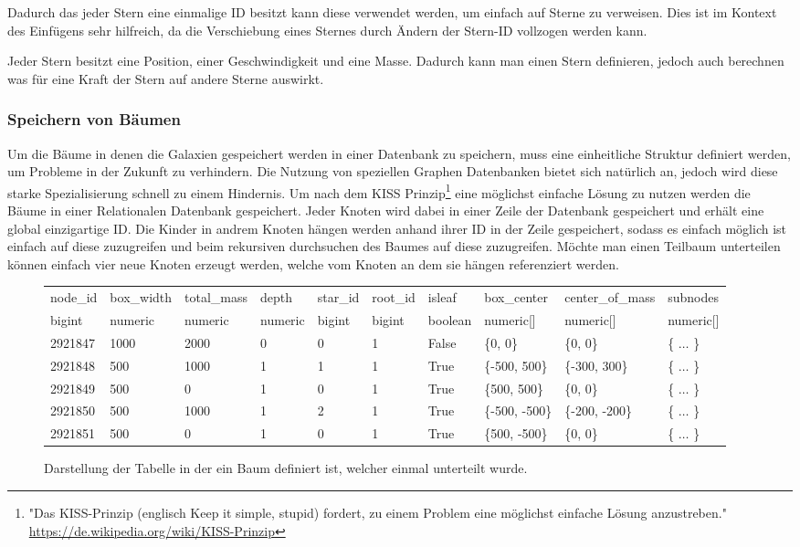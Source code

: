 Dadurch das jeder Stern eine einmalige ID besitzt kann diese verwendet werden, um einfach auf Sterne zu verweisen. Dies ist im Kontext des Einfügens sehr hilfreich, da die Verschiebung eines Sternes durch Ändern der Stern-ID vollzogen
werden kann.

\par Jeder Stern besitzt eine Position, einer Geschwindigkeit und eine Masse.
Dadurch kann man einen Stern definieren, jedoch auch berechnen was für eine
Kraft der Stern auf andere Sterne auswirkt.

\subsubsection{Speichern von Bäumen}
Um die Bäume in denen die Galaxien gespeichert werden in einer Datenbank zu
speichern, muss eine einheitliche Struktur definiert werden, um Probleme in der
Zukunft zu verhindern. Die Nutzung von speziellen Graphen Datenbanken bietet
sich natürlich an, jedoch wird diese starke Spezialisierung schnell zu einem
Hindernis. Um nach dem KISS Prinzip\footnote{"Das KISS-Prinzip (englisch Keep
it simple, stupid) fordert, zu einem Problem eine möglichst einfache Lösung
anzustreben." \url{https://de.wikipedia.org/wiki/KISS-Prinzip}} eine möglichst
einfache Lösung zu nutzen werden die Bäume in einer Relationalen Datenbank
gespeichert. Jeder Knoten wird dabei in einer Zeile der Datenbank gespeichert
und erhält eine global einzigartige ID. Die Kinder in andrem Knoten hängen
werden anhand ihrer ID in der Zeile gespeichert, sodass es einfach möglich ist
einfach auf diese zuzugreifen und beim rekursiven durchsuchen des Baumes auf
diese zuzugreifen. Möchte man einen Teilbaum unterteilen können einfach vier
neue Knoten erzeugt werden, welche vom Knoten an dem sie hängen referenziert
werden.

\begin{figure*}[ht]
\begin{tabular} {l | l | l | l | l | l | l | l | l | l}
node\_id & box\_width & total\_mass & depth & star\_id & root\_id & isleaf & box\_center & center\_of\_mass & subnodes  \\ 
bigint & numeric & numeric & numeric & bigint & bigint & boolean & numeric[] & numeric[] & numeric[]  \\ \hline\hline
2921847 & 1000 & 2000 & 0 & 0 & 1 & False & \{0, 0\}       & \{0, 0\}       & \{ \(\dots\) \}  \\ \hline
2921848 & 500  & 1000 & 1 & 1 & 1 & True  & \{-500, 500\}  & \{-300, 300\}  & \{ \(\dots\) \}  \\ \hline
2921849 & 500  & 0    & 1 & 0 & 1 & True  & \{500, 500\}   & \{0, 0\}       & \{ \(\dots\) \}  \\ \hline
2921850 & 500  & 1000 & 1 & 2 & 1 & True  & \{-500, -500\} & \{-200, -200\} & \{ \(\dots\) \}  \\ \hline
2921851 & 500  & 0    & 1 & 0 & 1 & True  & \{500, -500\}  & \{0, 0\}       & \{ \(\dots\) \}  \\ \hline
\end{tabular}
\caption{Darstellung der Tabelle in der ein Baum definiert ist, welcher einmal unterteilt wurde.}
\end{figure*}


